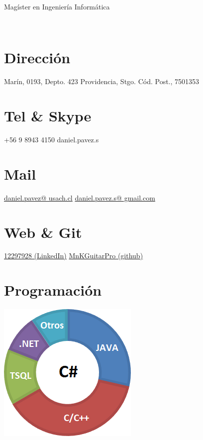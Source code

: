 \documentclass[]{friggeri-cv}
\begin{document}
      {Mag{\'i}ster en Ingenier{\'i}a Inform{\'a}tica}


\begin{aside}
    ~
    ~
    ~
    ~
    ~
  \section{Direcci{\'o}n}
    Mar{\'i}n, 0193, 
    Depto. 423
    Providencia, Stgo.
    C{\'o}d. Post.,
    7501353
    ~
  \section{Tel \& Skype}
    +56 9 8943 4150
    daniel.pavez.s
    ~
  \section{Mail}
    \href{mailto:daniel.pavez@usach.cl}{daniel.pavez@ usach.cl}
    \href{mailto:daniel.pavez.s@gmail.com}{daniel.pavez.s@ gmail.com}
    ~
  \section{Web \& Git}
    \href{https://cl.linkedin.com/in/daniel-ignacio-pavez-sandoval-12297928}{12297928 (LinkedIn)}
    \href{https://github.com/MnKGuitarPro}{MnKGuitarPro (github)}
    ~
  \section{Programaci{\'o}n}
    \includegraphics[scale=0.53]{img/Lenguajes.png}
    ~

\end{aside}
\end{document}
